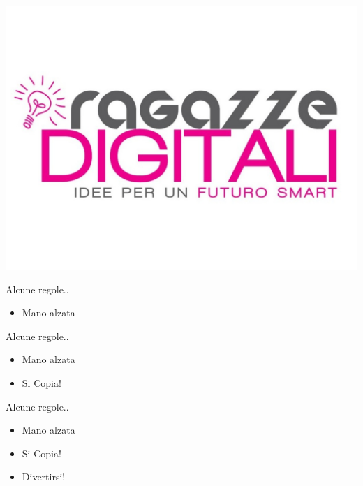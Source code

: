 
{\includegraphics[width=\paperwidth,height=\paperheight]{images/ragazze_digitali.jpg}}
\begin{frame}
\end{frame}


\begin{frame}{Alcune regole..}
	\begin{itemize}
	    \item Mano alzata
    \end{itemize}
\end{frame}

\begin{frame}{Alcune regole..}
	\begin{itemize}
	    \item Mano alzata
        \item Si Copia!
    \end{itemize}
\end{frame}

\begin{frame}{Alcune regole..}
	\begin{itemize}
	    \item Mano alzata
        \item Si Copia!
        \item Divertirsi!
    \end{itemize}
\end{frame}

